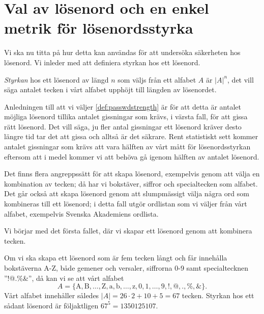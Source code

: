 \section{Val av lösenord och en enkel metrik för lösen\-ords\-styrka}
\label{sec:choice}

Vi ska nu titta på hur detta kan användas för att undersöka säkerheten hos
lösenord.
Vi inleder med att definiera styrkan hos ett lösenord.
\begin{definition}\label{def:passwdstrength}
  \emph{Styrkan} hos ett lösenord av längd \(n\) som väljs från ett alfabet 
  \(A\) är \(|A|^n\), det vill säga antalet tecken i vårt alfabet upphöjt till 
  längden av lösenordet.
\end{definition}
Anledningen till att vi väljer \cref{def:passwdstrength} är för att detta 
är antalet möjliga lösenord tillika antalet gissningar som krävs, i värsta 
fall, för att gissa rätt lösenord.
Det vill säga, ju fler antal gissningar ett lösenord kräver desto längre tid 
tar det att gissa och alltså är det säkrare.
Rent statistiskt sett kommer antalet gissningar som krävs att vara hälften av 
vårt mått för lösenordsstyrkan eftersom att i medel kommer vi att behöva gå 
igenom hälften av antalet lösenord.

Det finns flera angreppssätt för att skapa lösenord, exempelvis genom att
välja en kombination av tecken; då har vi bokstäver, siffror och specialtecken 
som alfabet.
Det går också att skapa lösenord genom att slumpmässigt välja några ord som
kombineras till ett lösenord; i detta fall utgör ordlistan som vi väljer från 
vårt alfabet, exempelvis Svenska Akademiens ordlista.

Vi börjar med det första fallet, där vi skapar ett lösenord genom att kombinera
tecken.
\begin{example}\label{ex:characters}
  Om vi ska skapa ett lösenord som är fem tecken långt och får innehålla
  bokstäverna A-Z, både gemener och versaler, siffrorna 0-9 samt specialtecknen 
  ''!@.\%\&'', då kan vi se att vårt alfabet \[A = \{\text{A}, \text{B}, 
  \ldots, \text{Z}, \text{a}, \text{b}, \ldots, \text{z}, 0, 1, \ldots, 9, 
  \text{!}, \text{@}, \text{.}, \text{\%}, \text{\&}\}.\]
  Vårt alfabet innehåller således \(|A| = 26\cdot 2 + 10 + 5 = 67\) tecken.
  Styrkan hos ett sådant lösenord är följaktligen \(67^5 = 1350125107\).
\end{example}

